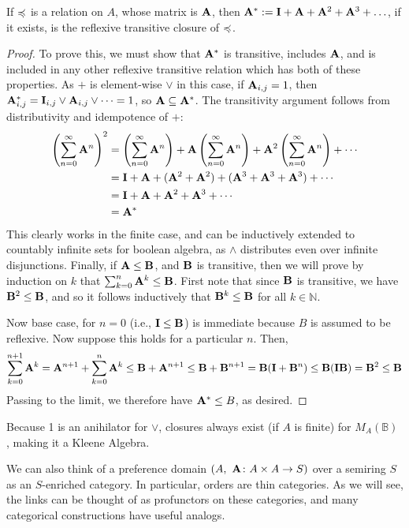 \documentclass{article}
\begin{document}
	\begin{prop}
		If $\preccurlyeq$ is a relation on $A$, whose matrix is $\mathbf A$, then $\mathbf A^* := \mathbf I + \mathbf A + \mathbf A^2 + \mathbf A^3 + \ldots$, if it exists, is the reflexive transitive closure of $\preccurlyeq$.
	\end{prop}
	\begin{proof}
		To prove this, we must show that $\mathbf A^*$ is transitive, includes $\mathbf A$, and is included in any other reflexive transitive relation which has both of these properties. 
		As $+$ is element-wise $\lor$ in this case, if $\mathbf A_{i,j} = 1$, then $\mathbf A_{i,j}^* = \mathbf I_{i,j} \lor \mathbf A_{i,j} \lor \cdots = 1$, so $\mathbf A \subseteq \mathbf A^*$. The transitivity argument follows from distributivity and idempotence of $+$: 
		\begin{align*}
			\left(\sum_{n=0}^\infty \mathbf A^n \right)^2 &= \left(\sum_{n=0}^\infty \mathbf A^n \right) + \mathbf A \left(\sum_{n=0}^\infty \mathbf A^n \right) + \mathbf A^2 \left(\sum_{n=0}^\infty \mathbf A^n \right)  + \cdots \\
			&= \mathbf I + \mathbf A + (\mathbf A^2 + \mathbf A^2) + (\mathbf A^3 +\mathbf A^3 + \mathbf A^3) +\cdots \\
			&= \mathbf I + \mathbf A + \mathbf A^2 + \mathbf A^3 + \cdots\\
			&= \mathbf A^*
		\end{align*}
		This clearly works in the finite case, and can be inductively extended to countably infinite sets for boolean algebra, as $\land$ distributes even over infinite disjunctions. Finally, if $\mathbf A \leq \mathbf B$, and $\mathbf B$ is transitive, then we will prove by induction on $k$ that $\sum_{k=0}^n \mathbf A^k \leq \mathbf B$. First note that since $\mathbf B$ is transitive, we have $\mathbf B^2 \leq \mathbf B$, and so it follows inductively that $\mathbf B^k \leq \mathbf B$ for all $k \in \mathbb N$. 
		
		Now base case, for $n=0$ (i.e., $\mathbf I \leq \mathbf B$) is immediate because $B$ is assumed to be reflexive. Now suppose this holds for a particular $n$. Then,		
		\begin{equation*}
			\sum_{k=0}^{n+1} \mathbf A^k  = \mathbf A^{n+1}  + \sum_{k=0}^n \mathbf A^k \leq \mathbf B + \mathbf A^{n+1} \leq \mathbf B + \mathbf B^{n+1} = \mathbf B (\mathbf I + \mathbf B^n) \leq \mathbf B (\mathbf I \mathbf B) = \mathbf B^2 \leq \mathbf B
		\end{equation*}
		Passing to the limit, we therefore have $\mathbf A^* \leq B$, as desired.		
	\end{proof}
	\begin{remark}
		Because 1 is an anihilator for $\lor$, closures always exist (if $A$ is finite) for $M_A(\mathbb B)$ \cite{pathproblems-lec3}, making it a Kleene Algebra.
	\end{remark}
	\begin{remark}
		We can also think of a preference domain $(A,~\mathbf A\colon A\times A \to S)$ over a semiring $S$ as an $S$-enriched category. In particular, orders are thin categories. As we will see, the links can be thought of as profunctors on these categories, and many categorical constructions have useful analogs.
	\end{remark}
\end{document}
